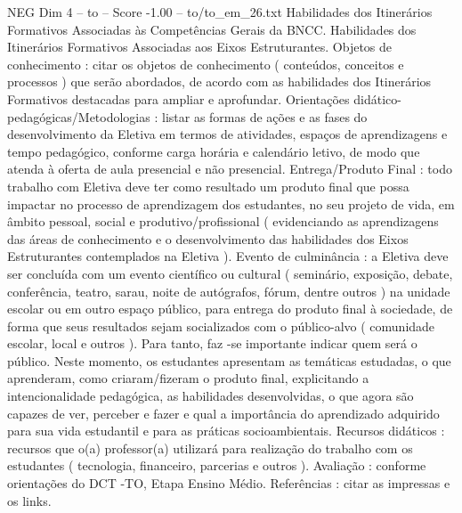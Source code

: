 \begin{textsample}{NEG Dim 4 – to – Score -1.00 – to/to\_em\_26.txt}
Habilidades dos Itinerários Formativos Associadas às Competências Gerais da BNCC.
Habilidades dos Itinerários Formativos Associadas aos Eixos Estruturantes.
Objetos de conhecimento : citar os objetos de conhecimento ( conteúdos, conceitos e processos ) que serão abordados, de acordo com as habilidades dos Itinerários Formativos destacadas para ampliar e aprofundar.
Orientações didático-pedagógicas/Metodologias : listar as formas de ações e as fases do desenvolvimento da Eletiva em termos de atividades, espaços de aprendizagens e tempo pedagógico, conforme carga horária e calendário letivo, de modo que atenda à oferta de aula presencial e não presencial.
Entrega/Produto Final : todo trabalho com Eletiva deve ter como resultado um produto final que possa impactar no processo de aprendizagem dos estudantes, no seu projeto de vida, em âmbito pessoal, social e produtivo/profissional ( evidenciando as aprendizagens das áreas de conhecimento e o desenvolvimento das habilidades dos Eixos Estruturantes contemplados na Eletiva ).
Evento de culminância : a Eletiva deve ser concluída com um evento científico ou cultural ( seminário, exposição, debate, conferência, teatro, sarau, noite de autógrafos, fórum, dentre outros ) na unidade escolar ou em outro espaço público, para entrega do produto final à sociedade, de forma que seus resultados sejam socializados com o público-alvo ( comunidade escolar, local e outros ).
Para tanto, faz -se importante indicar quem será o público.
Neste momento, os estudantes apresentam as temáticas estudadas, o que aprenderam, como criaram/fizeram o produto final, explicitando a intencionalidade pedagógica, as habilidades desenvolvidas, o que agora são capazes de ver, perceber e fazer e qual a importância do aprendizado adquirido para sua vida estudantil e para as práticas socioambientais.
Recursos didáticos : recursos que o(a) professor(a) utilizará para realização do trabalho com os estudantes ( tecnologia, financeiro, parcerias e outros ).
Avaliação : conforme orientações do DCT -TO, Etapa Ensino Médio.
Referências : citar as impressas e os links.

\end{textsample}
